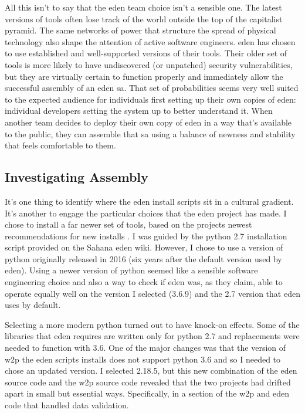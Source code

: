 \documentclass[a4paper,man,natbib,floatsintext]{apa6}
\begin{document}
   All this isn't to say that the \acrshort{eden} team choice isn't a sensible one. The latest versions of tools often lose track of the world outside the top of the capitalist pyramid. The same networks of power that structure the spread of physical technology also shape the attention of active software engineers. \acrshort{eden} has chosen to use established and well-supported versions of their tools. Their older set of tools is more likely to have undiscovered (or unpatched) security vulnerabilities, but they are virtually certain to function properly and immediately allow the successful assembly of an \acrshort{eden} \gls{sa}. That set of probabilities seems very well suited to the expected audience for individuals first setting up their own copies of \acrshort{eden}: individual developers setting the system up to better understand it. When another team decides to deploy their own copy of \acrshort{eden} in a way that's available to the public, they can assemble that \gls{sa} using a balance of newness and stability that feels comfortable to them. 

   \subsection{Investigating Assembly}
   It's one thing to identify where the \acrshort{eden} install scripts sit in a cultural gradient. It's another to engage the particular choices that the \acrshort{eden} project has made. I chose to install a far newer set of tools, based on the projects newest recommendations for new installs \citep{Konig2019-ya}. I was guided by the \gls{python} 2.7 installation script provided on the Sahana \acrshort{eden} wiki. However, I chose to use a version of \gls{python} originally released in 2016 (six years after the default version used by \acrshort{eden}). Using a newer version of python seemed like a sensible software engineering choice and also a way to check if \acrshort{eden} was, as they claim, able to operate equally well on the version I selected (3.6.9) and the 2.7 version that \acrshort{eden} uses by default.

   Selecting a more modern \gls{python} turned out to have knock-on effects. Some of the libraries that \acrshort{eden} requires are written only for \gls{python} 2.7 and replacements were needed to function with 3.6. One of the major changes was that the version of \gls{w2p} the \acrshort{eden} scripts installs does not support \gls{python} 3.6 and so I needed to chose an updated version. I selected 2.18.5, but this new combination of the \acrshort{eden} source code and the \gls{w2p} source code revealed that the two projects had drifted apart in small but essential ways. Specifically, in a section of the \gls{w2p} and \acrshort{eden} code that handled data validation.
\end{document}
